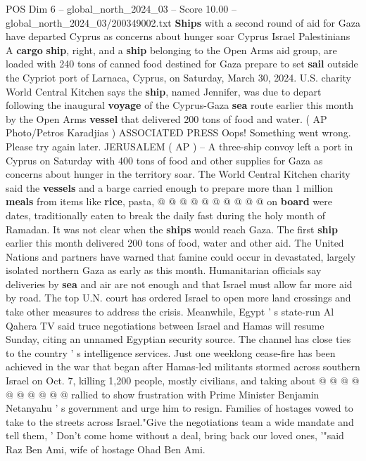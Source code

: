 \begin{textsample}{POS Dim 6 – global\_north\_2024\_03 – Score 10.00 – global\_north\_2024\_03/200349002.txt}  \label{ex:f6_pos_056}
\textbf{Ships} with a second round of aid for Gaza have departed Cyprus as concerns about hunger soar Cyprus Israel Palestinians A \textbf{cargo} \textbf{ship}, right, and a \textbf{ship} belonging to the Open Arms aid group, are loaded with 240 tons of canned food destined for Gaza prepare to set \textbf{sail} outside the Cypriot port of Larnaca, Cyprus, on Saturday, March 30, 2024.
U.S. charity World Central Kitchen says the \textbf{ship}, named Jennifer, was due to depart following the inaugural \textbf{voyage} of the Cyprus-Gaza \textbf{sea} route earlier this month by the Open Arms \textbf{vessel} that delivered 200 tons of food and water. ( AP Photo/Petros Karadjias ) ASSOCIATED PRESS Oops!
Something went wrong.
Please try again later.
JERUSALEM ( AP ) -- A three-ship convoy left a port in Cyprus on Saturday with 400 tons of food and other supplies for Gaza as concerns about hunger in the territory soar.
The World Central Kitchen charity said the \textbf{vessels} and a barge carried enough to prepare more than 1 million \textbf{meals} from items like \textbf{rice}, pasta, @ @ @ @ @ @ @ @ @ @ on \textbf{board} were dates, traditionally eaten to break the daily fast during the holy month of Ramadan.
It was not clear when the \textbf{ships} would reach Gaza.
The first \textbf{ship} earlier this month delivered 200 tons of food, water and other aid.
The United Nations and partners have warned that famine could occur in devastated, largely isolated northern Gaza as early as this month.
Humanitarian officials say deliveries by \textbf{sea} and air are not enough and that Israel must allow far more aid by road.
The top U.N. court has ordered Israel to open more land crossings and take other measures to address the crisis.
Meanwhile, Egypt ' s state-run Al Qahera TV said truce negotiations between Israel and Hamas will resume Sunday, citing an unnamed Egyptian security source.
The channel has close ties to the country ' s intelligence services.
Just one weeklong cease-fire has been achieved in the war that began after Hamas-led militants stormed across southern Israel on Oct. 7, killing 1,200 people, mostly civilians, and taking about @ @ @ @ @ @ @ @ @ @ rallied to show frustration with Prime Minister Benjamin Netanyahu ' s government and urge him to resign.
Families of hostages vowed to take to the streets across Israel."Give the negotiations team a wide mandate and tell them, ' Don't come home without a deal, bring back our loved ones, '"said Raz Ben Ami, wife of hostage Ohad Ben Ami.

\end{textsample}
